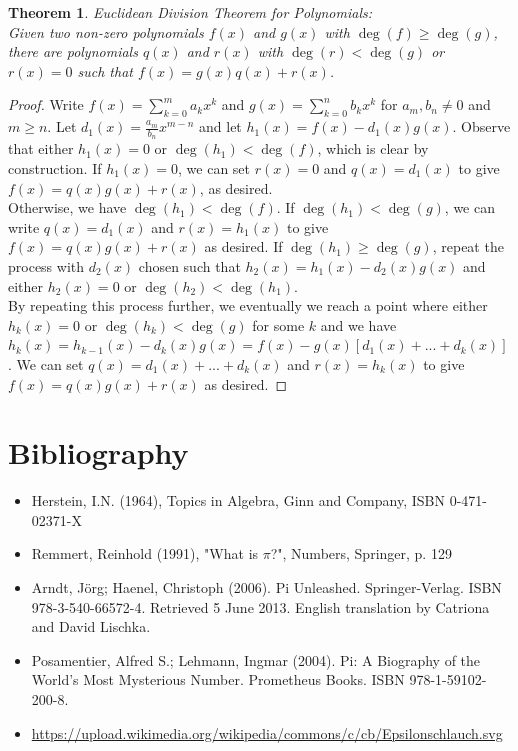 \documentclass[12pt, a4paper, titlepage, twoside]{article}
\newtheorem*{theorem*}{Theorem}
\begin{document}
	\hfill	
	
	\begin{pf}
		\label{apA:euc-div}
		\begin{theorem*}
			Euclidean Division Theorem for Polynomials:\\
			Given two non-zero polynomials $f(x)$ and $g(x)$ with $\deg(f) \geqslant \deg(g)$, there are polynomials
			$q(x)$ and $r(x)$ with $\deg(r) < \deg(g)$ or $r(x) = 0$ such that $f(x) = g(x)q(x) + r(x)$.
		\end{theorem*}

		\tcbline		
		
		\begin{proof}
			Write $f(x) = \sum_{k=0}^m a_k x^k$ and $g(x) = \sum_{k=0}^n b_k x^k$ for $a_m, b_n \neq 0$ and $m \geqslant n$.
			Let $d_1(x) = \frac{a_m}{b_n}x^{m-n}$ and let $h_1(x) = f(x) - d_1(x) g(x)$.
			Observe that either $h_1(x) = 0$ or $\deg(h_1) < \deg(f)$, which is clear by construction.
			If $h_1(x) = 0$, we can set $r(x) = 0$ and $q(x) = d_1(x)$ to give $f(x) = q(x) g(x) + r(x)$, as desired.\\
			
			Otherwise, we have $\deg(h_1) < \deg(f)$. If $\deg(h_1) < \deg(g)$, we
			can write $q(x) = d_1(x)$ and $r(x) = h_1(x)$ to give $f(x) = q(x) g(x) + r(x)$ as desired. If $\deg(h_1) \geqslant \deg(g)$, repeat the 
			process with $d_2(x)$ chosen such that $h_2(x) = h_1(x) - d_2(x) g(x)$ and either $h_2(x) = 0$ or $\deg(h_2) < \deg(h_1)$.\\
			
			By repeating this process further, we
			eventually we reach a point where either $h_k(x) = 0$ or $\deg(h_k) < \deg(g)$ for some $k$ and we have $h_k(x) = h_{k-1}(x) - 
			d_k(x) g(x) = f(x) - g(x) [d_1(x) + ... + d_k(x)]$.
			We can set $q(x) = d_1(x) + ... + d_k(x)$ and $r(x) = h_k(x)$ to give $f(x) = q(x) g(x) + r(x)$ as desired.
		\end{proof}
	\end{pf}
	
	\newpage	
	
\section{Bibliography}
	\begin{itemize}
		\item Herstein, I.N. (1964), Topics in Algebra, Ginn and Company, ISBN 0-471-02371-X
		\item Remmert, Reinhold (1991), "What is $\pi$?", Numbers, Springer, p. 129
		\item Arndt, Jörg; Haenel, Christoph (2006). Pi Unleashed. Springer-Verlag. ISBN 978-3-540-66572-4. Retrieved 5 June 2013. 
		English translation by Catriona and David Lischka.
		\item Posamentier, Alfred S.; Lehmann, Ingmar (2004). Pi: A Biography of the World's Most Mysterious Number. Prometheus Books. 
		ISBN 978-1-59102-200-8.
		\item \sloppy \url{https://upload.wikimedia.org/wikipedia/commons/c/cb/Epsilonschlauch.svg}
	\end{itemize}		
\end{document}
